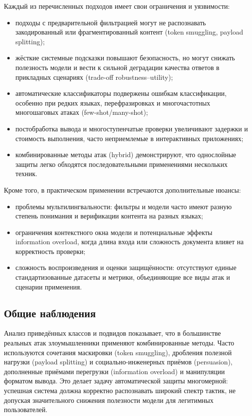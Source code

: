 Каждый из перечисленных подходов имеет свои ограничения и уязвимости:
\begin{itemize}
  \item подходы с предварительной фильтрацией могут не распознавать закодированный или фрагментированный контент (token smuggling, payload splitting);
  \item жёсткие системные подсказки повышают безопасность, но могут снижать полезность модели и вести к сильной деградации качества ответов в прикладных сценариях (trade-off robustness--utility);
  \item автоматические классификаторы подвержены ошибкам классификации, особенно при редких языках, перефразировках и многочастотных многошаговых атаках (few-shot/many-shot);
  \item постобработка вывода и многоступенчатые проверки увеличивают задержки и стоимость выполнения, часто неприемлемые в интерактивных приложениях;
  \item комбинированные методы атак (hybrid) демонстрируют, что однослойные защиты легко обходятся последовательными применениями нескольких техник.
\end{itemize}

Кроме того, в практическом применении встречаются дополнительные нюансы:
\begin{itemize}
  \item проблемы мультилингвальности: фильтры и модели часто имеют разную степень понимания и верификации контента на разных языках;
  \item ограничения контекстного окна модели и потенциальные эффекты information overload, когда длина входа или сложность документа влияет на корректность проверки;
  \item сложность воспроизведения и оценки защищённости: отсутствуют единые стандартизованные датасеты и метрики, объединяющие все виды атак и сценарии применения.
\end{itemize}

\subsection{Общие наблюдения}

Анализ приведённых классов и подвидов показывает, что в большинстве реальных атак злоумышленники применяют комбинированные методы. Часто используются сочетания маскировки (token smuggling), дробления полезной нагрузки (payload splitting) и социально-инженерных приёмов (persuasion), дополненные приёмами перегрузки (information overload) и манипуляции форматом вывода. Это делает задачу автоматической защиты многомерной: успешная система должна корректно распознавать широкий спектр тактик, не допуская значительного снижения полезности модели для легитимных пользователей.

